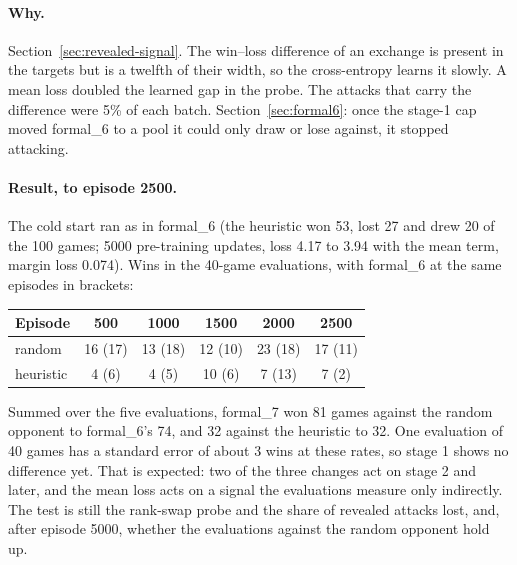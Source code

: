 \paragraph{Why.} Section~\ref{sec:revealed-signal}. The win--loss difference of an exchange is
present in the targets but is a twelfth of their width, so the cross-entropy learns it slowly.
A mean loss doubled the learned gap in the probe. The attacks that carry the difference were 5\%
of each batch. Section~\ref{sec:formal6}: once the stage-1 cap moved formal\_6 to a pool it could
only draw or lose against, it stopped attacking.

\paragraph{Result, to episode 2500.} The cold start ran as in formal\_6 (the heuristic won 53,
lost 27 and drew 20 of the 100 games; 5000 pre-training updates, loss 4.17 to 3.94 with the mean
term, margin loss 0.074). Wins in the 40-game evaluations, with formal\_6 at the same episodes in
brackets:
\begin{center}
\begin{tabular}{lccccc}
\toprule
Episode & 500 & 1000 & 1500 & 2000 & 2500 \\
\midrule
random    & 16 (17) & 13 (18) & 12 (10) & 23 (18) & 17 (11) \\
heuristic & 4 (6)   & 4 (5)   & 10 (6)  & 7 (13)  & 7 (2) \\
\bottomrule
\end{tabular}
\end{center}
Summed over the five evaluations, formal\_7 won 81 games against the random opponent to formal\_6's
74, and 32 against the heuristic to 32. One evaluation of 40 games has a standard error of about
3 wins at these rates, so stage 1 shows no difference yet. That is expected: two of the three
changes act on stage 2 and later, and the mean loss acts on a signal the evaluations measure only
indirectly. The test is still the rank-swap probe and the share of revealed attacks lost, and,
after episode 5000, whether the evaluations against the random opponent hold up.


